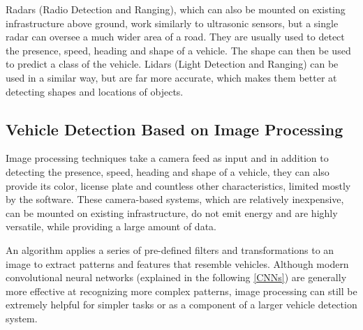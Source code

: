 Radars (Radio Detection and Ranging), which can also be mounted on existing
infrastructure above ground, work similarly to ultrasonic sensors, but a single
radar can oversee a much wider area of a road.\cite{RadarSensors} They are
usually used to detect the presence, speed, heading and shape of a vehicle. The
shape can then be used to predict a class of the vehicle. Lidars (Light
Detection and Ranging) can be used in a similar way, but are far more accurate,
which makes them better at detecting shapes and locations of objects.



\subsection{Vehicle Detection Based on Image Processing}







Image processing techniques take a camera feed as input and in addition to
detecting the presence, speed, heading and shape of a vehicle, they can
also provide its color, license plate and countless other characteristics,
limited mostly by the software. These camera-based systems, which are
relatively inexpensive, can be mounted on existing infrastructure, do not emit
energy and are highly versatile, while providing a large amount of data.

An algorithm applies a series of pre-defined filters and transformations to an
image to extract patterns and features that resemble vehicles. Although modern
convolutional neural networks (explained in the following \autoref{CNNs}) are generally
more effective at recognizing more complex patterns, image processing can still
be extremely helpful for simpler tasks or as a component of a larger vehicle
detection system.

